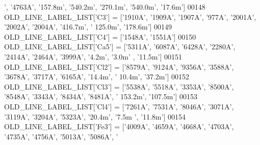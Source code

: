 \begin{DoxyCode}
{{{      '}, \textcolor{stringliteral}{'4763A'}, \textcolor{stringliteral}{'157.8m'}, \textcolor{stringliteral}{'540.2m'}, \textcolor{stringliteral}{'270.1m'}, \textcolor{stringliteral}{'540.0m'}, \textcolor{stringliteral}{'17.6m'}]
00148 OLD\_LINE\_LABEL\_LIST[\textcolor{stringliteral}{'C3'}] = [\textcolor{stringliteral}{'1910A'}, \textcolor{stringliteral}{'1909A'}, \textcolor{stringliteral}{'1907A'}, \textcolor{stringliteral}{'977A'}, \textcolor{stringliteral}{'2001A'}, \textcolor{stringliteral}{'2002A'}, \textcolor{stringliteral}{'2004A'}, \textcolor{stringliteral}{'416.7m'}, \textcolor{stringliteral}{'
      125.0m'}, \textcolor{stringliteral}{'178.6m'}]
00149 OLD\_LINE\_LABEL\_LIST[\textcolor{stringliteral}{'C4'}] = [\textcolor{stringliteral}{'1548A'}, \textcolor{stringliteral}{'1551A'}]
00150 OLD\_LINE\_LABEL\_LIST[\textcolor{stringliteral}{'Ca5'}] = [\textcolor{stringliteral}{'5311A'}, \textcolor{stringliteral}{'6087A'}, \textcolor{stringliteral}{'6428A'}, \textcolor{stringliteral}{'2280A'}, \textcolor{stringliteral}{'2414A'}, \textcolor{stringliteral}{'2464A'}, \textcolor{stringliteral}{'3999A'}, \textcolor{stringliteral}{'4.2m'}, \textcolor{stringliteral}{'3.0m'}
      , \textcolor{stringliteral}{'11.5m'}]
00151 OLD\_LINE\_LABEL\_LIST[\textcolor{stringliteral}{'Cl2'}] = [\textcolor{stringliteral}{'8579A'}, \textcolor{stringliteral}{'9124A'}, \textcolor{stringliteral}{'9356A'}, \textcolor{stringliteral}{'3588A'}, \textcolor{stringliteral}{'3678A'}, \textcolor{stringliteral}{'3717A'}, \textcolor{stringliteral}{'6165A'}, \textcolor{stringliteral}{'14.4m'}, \textcolor{stringliteral}{'
      10.4m'}, \textcolor{stringliteral}{'37.2m'}]
00152 OLD\_LINE\_LABEL\_LIST[\textcolor{stringliteral}{'Cl3'}] = [\textcolor{stringliteral}{'5538A'}, \textcolor{stringliteral}{'5518A'}, \textcolor{stringliteral}{'3353A'}, \textcolor{stringliteral}{'8500A'}, \textcolor{stringliteral}{'8548A'}, \textcolor{stringliteral}{'3343A'}, \textcolor{stringliteral}{'8434A'}, \textcolor{stringliteral}{'8481A'}, \textcolor{stringliteral}{'
      153.2m'}, \textcolor{stringliteral}{'107.5m'}]
00153 OLD\_LINE\_LABEL\_LIST[\textcolor{stringliteral}{'Cl4'}] = [\textcolor{stringliteral}{'7261A'}, \textcolor{stringliteral}{'7531A'}, \textcolor{stringliteral}{'8046A'}, \textcolor{stringliteral}{'3071A'}, \textcolor{stringliteral}{'3119A'}, \textcolor{stringliteral}{'3204A'}, \textcolor{stringliteral}{'5323A'}, \textcolor{stringliteral}{'20.4m'}, \textcolor{stringliteral}{'7.5m
      '}, \textcolor{stringliteral}{'11.8m'}]
00154 OLD\_LINE\_LABEL\_LIST[\textcolor{stringliteral}{'Fe3'}] = [\textcolor{stringliteral}{'4009A'}, \textcolor{stringliteral}{'4659A'}, \textcolor{stringliteral}{'4668A'}, \textcolor{stringliteral}{'4703A'}, \textcolor{stringliteral}{'4735A'}, \textcolor{stringliteral}{'4756A'}, \textcolor{stringliteral}{'5013A'}, \textcolor{stringliteral}{'5086A'}, \textcolor{stringliteral}{'
}}}
\end{DoxyCode}
